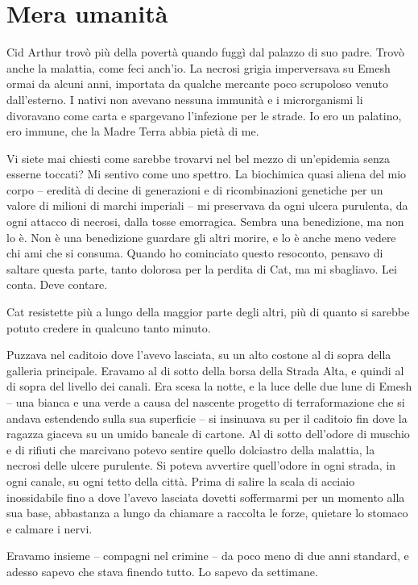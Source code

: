 \chapter{Mera umanità}

Cid Arthur trovò più della povertà quando fuggì dal palazzo di suo
padre. Trovò anche la malattia, come feci anch'io. La necrosi grigia
imperversava su Emesh ormai da alcuni anni, importata da qualche
mercante poco scrupoloso venuto dall'esterno. I nativi non avevano
nessuna immunità e i microrganismi li divoravano come carta e spargevano
l'infezione per le strade. Io ero un palatino, ero immune, che la Madre
Terra abbia pietà di me.

Vi siete mai chiesti come sarebbe trovarvi nel bel mezzo di un'epidemia
senza esserne toccati? Mi sentivo come uno spettro. La biochimica quasi
aliena del mio corpo -- eredità di decine di generazioni e di
ricombinazioni genetiche per un valore di milioni di marchi imperiali --
mi preservava da ogni ulcera purulenta, da ogni attacco di necrosi,
dalla tosse emorragica. Sembra una benedizione, ma non lo è. Non è una
benedizione guardare gli altri morire, e lo è anche meno vedere chi ami
che si consuma. Quando ho cominciato questo resoconto, pensavo di
saltare questa parte, tanto dolorosa per la perdita di Cat, ma mi
sbagliavo. Lei conta. Deve contare.

Cat resistette più a lungo della maggior parte degli altri, più di
quanto si sarebbe potuto credere in qualcuno tanto minuto.

Puzzava nel caditoio dove l'avevo lasciata, su un alto costone al di
sopra della galleria principale. Eravamo al di sotto della borsa della
Strada Alta, e quindi al di sopra del livello dei canali. Era scesa la
notte, e la luce delle due lune di Emesh -- una bianca e una verde a
causa del nascente progetto di terraformazione che si andava
{estendendo} sulla sua superficie -- si insinuava su per il caditoio fin
dove la ragazza giaceva su un umido bancale di cartone. Al di sotto
dell'odore di muschio e di rifiuti che marcivano potevo sentire quello
dolciastro della malattia, la necrosi delle ulcere purulente. Si poteva
avvertire quell'odore in ogni strada, in ogni canale, su ogni tetto
della città. Prima di salire la scala di acciaio inossidabile fino a
dove l'avevo lasciata dovetti soffermarmi per un momento alla sua base,
abbastanza a lungo da chiamare a raccolta le forze, quietare lo stomaco
e calmare i nervi.

Eravamo insieme -- compagni nel crimine -- da poco meno di due anni
standard, e adesso sapevo che stava finendo tutto. Lo sapevo da
settimane.

